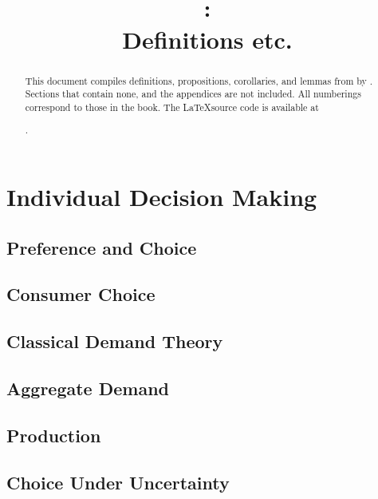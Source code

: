 \documentclass{report} %
\title{\citetitle{mas1995microeconomic}\\\parencite{mas1995microeconomic}:\\Definitions etc.}
\author{}
\date{}
\theoremstyle{definition}
\begin{document}
\maketitle

\renewcommand{\abstractname}{Preface}
\begin{abstract}
	This document compiles definitions, propositions, corollaries, and lemmas from  by \cite{mas1995microeconomic}.
	Sections that contain none, and the appendices are not included.
	All numberings correspond to those in the book.
	The \LaTeX source code is available at
	
	.
\end{abstract}

\tableofcontents

\part{Individual Decision Making}

\chapter{Preference and Choice}


\chapter{Consumer Choice}


\chapter{Classical Demand Theory}


\chapter{Aggregate Demand}


\chapter{Production}


\chapter{Choice Under Uncertainty}

\end{document}
